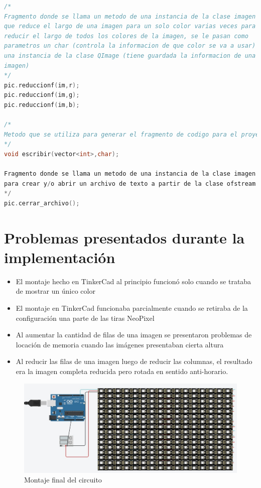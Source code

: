 \documentclass{article}
\begin{document}
\begin{lstlisting}[language=C++, label=codigo_ejemplo]
/*
Fragmento donde se llama un metodo de una instancia de la clase imagen
que reduce el largo de una imagen para un solo color varias veces para
reducir el largo de todos los colores de la imagen, se le pasan como
parametros un char (controla la informacion de que color se va a usar) y
una instancia de la clase QImage (tiene guardada la informacion de una
imagen)
*/
pic.reduccionf(im,r);
pic.reduccionf(im,g);
pic.reduccionf(im,b);

/*
Metodo que se utiliza para generar el fragmento de codigo para el proyecto de tinkercad, este es llamado al finalizar la reduccion o aumento de la imagen.Este metodo recibe un vector con uno de los colores RGB y tambien recibe un char con su respectiva letra(Rojo="r",Verde="g",Azul="b").
*/
void escribir(vector<int>,char);

Fragmento donde se llama un metodo de una instancia de la clase imagen
para crear y/o abrir un archivo de texto a partir de la clase ofstream
*/
pic.cerrar_archivo();

\end{lstlisting}

	\section{Problemas presentados durante la implementación}
	\begin{itemize}
	    \item El montaje hecho en TinkerCad al principio funcionó solo cuando se trataba de mostrar un único color
	    \item El montaje en TinkerCad funcionaba parcialmente cuando se retiraba de la configuración una parte de las tiras NeoPixel
	    \item Al aumentar la cantidad de filas de una imagen se presentaron problemas de locación de memoria cuando las imágenes presentaban cierta altura
	    \item Al reducir las filas de una imagen luego de reducir las columnas, el resultado era la imagen completa reducida pero rotada en sentido anti-horario.
	\end{itemize}

	\begin{figure}[h]
	    \centering
	    \includegraphics[width=12cm]{circuito.jpeg}
	    \caption{Montaje final del circuito}
	    \label{fig:Circuito}
	\end{figure}
\end{document}

